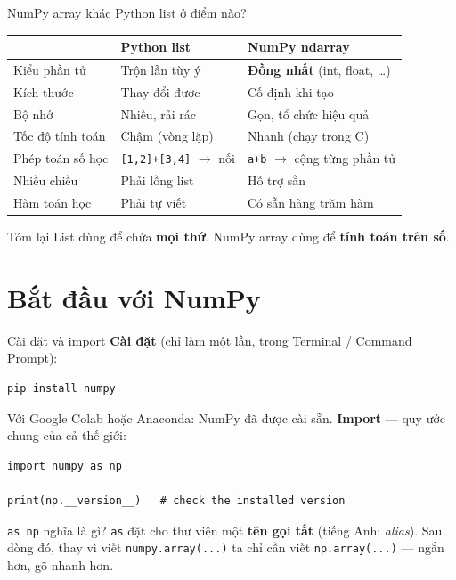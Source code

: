 \documentclass[11pt]{beamer}
\begin{document}
\begin{frame}{NumPy array khác Python list ở điểm nào?}
\begin{center}
\small
\begin{tabular}{|l|l|l|}
\hline
 & \textbf{Python list} & \textbf{NumPy ndarray} \\
\hline
Kiểu phần tử      & Trộn lẫn tùy ý       & \textbf{Đồng nhất} (int, float, \ldots) \\
Kích thước        & Thay đổi được        & Cố định khi tạo \\
Bộ nhớ            & Nhiều, rải rác       & Gọn, tổ chức hiệu quả \\
Tốc độ tính toán  & Chậm (vòng lặp)      & Nhanh (chạy trong C) \\
Phép toán số học  & \texttt{[1,2]+[3,4]} $\to$ nối & \texttt{a+b} $\to$ cộng từng phần tử \\
Nhiều chiều       & Phải lồng list       & Hỗ trợ sẵn \\
Hàm toán học      & Phải tự viết         & Có sẵn hàng trăm hàm \\
\hline
\end{tabular}
\end{center}
\begin{alertblock}{Tóm lại}
List dùng để chứa \textbf{mọi thứ}. NumPy array dùng để \textbf{tính toán trên số}.
\end{alertblock}
\end{frame}

\section{Bắt đầu với NumPy}

\begin{frame}[fragile]{Cài đặt và import}
\textbf{Cài đặt} (chỉ làm một lần, trong Terminal / Command Prompt):
\begin{lstlisting}[language=bash, numbers=none, keywordstyle=\color{black}]
pip install numpy
\end{lstlisting}
Với Google Colab hoặc Anaconda: NumPy đã được cài sẵn.
\vspace{0.3cm}
\textbf{Import} --- quy ước chung của cả thế giới:
\begin{lstlisting}
import numpy as np

print(np.__version__)   # check the installed version
\end{lstlisting}
\begin{block}{\texttt{as np} nghĩa là gì?}
\texttt{as} đặt cho thư viện một \textbf{tên gọi tắt} (tiếng Anh: \textit{alias}).
Sau dòng đó, thay vì viết \texttt{numpy.array(...)} ta chỉ cần viết \texttt{np.array(...)} --- ngắn hơn, gõ nhanh hơn.
\end{block}
\end{frame}
\end{document}
